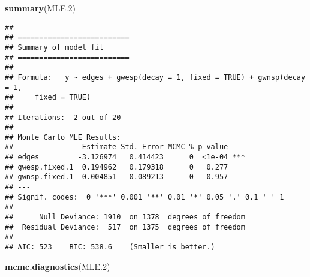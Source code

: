 \documentclass[]{book}
\newenvironment{Shaded}{\begin{snugshade}}{\end{snugshade}}
\newcommand{\KeywordTok}[1]{\textcolor[rgb]{0.13,0.29,0.53}{\textbf{{#1}}}}
\newcommand{\FloatTok}[1]{\textcolor[rgb]{0.00,0.00,0.81}{{#1}}}
\newcommand{\NormalTok}[1]{{#1}}
\begin{document}
\begin{Shaded}
\begin{Highlighting}[]
\KeywordTok{summary}\NormalTok{(MLE}\FloatTok{.2}\NormalTok{)}
\end{Highlighting}
\end{Shaded}

\begin{verbatim}
## 
## ==========================
## Summary of model fit
## ==========================
## 
## Formula:   y ~ edges + gwesp(decay = 1, fixed = TRUE) + gwnsp(decay = 1, 
##     fixed = TRUE)
## 
## Iterations:  2 out of 20 
## 
## Monte Carlo MLE Results:
##                Estimate Std. Error MCMC % p-value    
## edges         -3.126974   0.414423      0  <1e-04 ***
## gwesp.fixed.1  0.194962   0.179318      0   0.277    
## gwnsp.fixed.1  0.004851   0.089213      0   0.957    
## ---
## Signif. codes:  0 '***' 0.001 '**' 0.01 '*' 0.05 '.' 0.1 ' ' 1
## 
##      Null Deviance: 1910  on 1378  degrees of freedom
##  Residual Deviance:  517  on 1375  degrees of freedom
##  
## AIC: 523    BIC: 538.6    (Smaller is better.)
\end{verbatim}

\begin{Shaded}
\begin{Highlighting}[]
\KeywordTok{mcmc.diagnostics}\NormalTok{(MLE}\FloatTok{.2}\NormalTok{)}
\end{Highlighting}
\end{Shaded}
\end{document}
